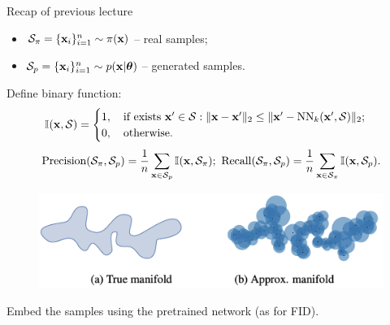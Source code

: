 \begin{frame}{Recap of previous lecture}
	\vspace{-0.2cm}
	\begin{itemize}
		\item $\mathcal{S}_{\pi} = \{\mathbf{x}_i\}_{i=1}^{n} \sim \pi(\mathbf{x})$ -- real samples;
		\item $\mathcal{S}_{p} = \{\mathbf{x}_i\}_{i=1}^{n} \sim p(\mathbf{x} | \boldsymbol{\theta})$ -- generated samples.
	\end{itemize}
	Define binary function:
	\vspace{-0.2cm}
	\[
		\mathbb{I}(\mathbf{x}, \mathcal{S}) = 
		\begin{cases}
			1, \quad \text{if exists } \mathbf{x}' \in \mathcal{S}: \| \mathbf{x}  - \mathbf{x}'\|_2 \leq \| \mathbf{x}' - \text{NN}_k(\mathbf{x}', \mathcal{S})\|_2; \\
			0, \quad \text{otherwise.}
		\end{cases}
	\]
	\vspace{-0.3cm}
	\[
		\text{Precision} (\mathcal{S}_{\pi}, \mathcal{S}_{p}) = \frac{1}{n} \sum_{\mathbf{\mathbf{x}} \in \mathcal{S}_{p}} \mathbb{I}(\mathbf{x}, \mathcal{S}_{\pi}); \,\, \text{Recall} (\mathcal{S}_{\pi}, \mathcal{S}_{p}) = \frac{1}{n} \sum_{\mathbf{x} \in \mathcal{S}_{\pi}} \mathbb{I}(\mathbf{x}, \mathcal{S}_{p}).
	\]
	\vspace{-0.6cm}
	\begin{figure}
		\includegraphics[width=0.75\linewidth]{figs/pr_k_nearest}
	\end{figure}
	Embed the samples using the pretrained network (as for FID).
\end{frame}
